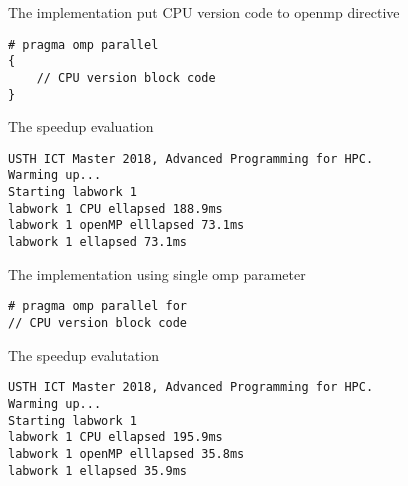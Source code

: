 \documentclass{article}
\begin{document}
The implementation put CPU version code to openmp directive
\begin{verbatim}
# pragma omp parallel
{
	// CPU version block code
}
\end{verbatim}

The speedup evaluation
\begin{verbatim}
USTH ICT Master 2018, Advanced Programming for HPC.
Warming up...
Starting labwork 1
labwork 1 CPU ellapsed 188.9ms
labwork 1 openMP elllapsed 73.1ms
labwork 1 ellapsed 73.1ms
\end{verbatim}

The implementation using single omp parameter
\begin{verbatim}
# pragma omp parallel for
// CPU version block code
\end{verbatim}

The speedup evalutation
\begin{verbatim}
USTH ICT Master 2018, Advanced Programming for HPC.
Warming up...
Starting labwork 1
labwork 1 CPU ellapsed 195.9ms
labwork 1 openMP elllapsed 35.8ms
labwork 1 ellapsed 35.9ms
\end{verbatim}
\end{document}
